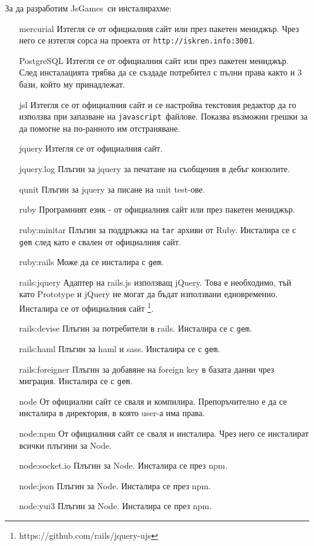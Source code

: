 \documentclass[a4paper]{article}
\def\js{\texttt{javascript}}
\def\jsg{JsGames}
\begin{document}
За да разработим \jsg \ си инсталирахме:
\begin{itemize}
  \item[mercurial] Изтегля се от официалния сайт или през пакетен мениджър. Чрез него се изтегля сорса на проекта от \texttt{http://iskren.info:3001}.
  \item[PostgreSQL] Изтегля се от официалния сайт или през пакетен мениджър. \\
    След инсталацията трябва да се създаде потребител с пълни права както и 3 бази, който му принадлежат.
  \item[jsl] Изтегля се от официалния сайт и се настройва текстовия редактор да го използва при запазване на \js\ файлове. Показва възможни грешки за да помогне на по-ранното им отстраняване.
  \item[jquery] Изтегля се от официалния сайт.
  \item[jquery.log] Плъгин за jquery за печатане на съобщения в дебъг конзолите.
  \item[qunit] Плъгин за jquery за писане на unit test-ове.
  \item[ruby] Програмният език - от официалния сайт или през пакетен мениджър.
  \item[ruby:minitar] Плъгин за поддръжка на \texttt{tar} архиви от Ruby. Инсталира се с \texttt{gem} след като е свален от официалния сайт.
  \item[ruby:rails] Може да се инсталира с \texttt{gem}.
  \item[rails:jquery] Адаптер на rails.js използващ jQuery. Това е необходимо, тъй като Prototype и jQuery не могат да бъдат използвани едновременно. Инсталира се от официалния сайт \footnote{https://github.com/rails/jquery-ujs}.
  \item[rails:devise] Плъгин за потребители в rails. Инсталира се с \texttt{gem}.
  \item[rails:haml] Плъгин за haml и sass. Инсталира се с \texttt{gem}.
  \item[rails:foreigner] Плъгин за добавяне на foreign key в базата данни чрез миграция. Инсталира се с \texttt{gem}.
  \item[node] От официални сайт се сваля и компилира. Препоръчително е да се инсталира в директория, в която user-а има права.
  \item[node:npm] От официалния сайт се сваля и инсталира. Чрез него се инсталират всички плъгини за Node.
  \item[node:socket.io] Плъгин за Node. Инсталира се през npm.
  \item[node:json] Плъгин за Node. Инсталира се през npm.
  \item[node:yui3] Плъгин за Node. Инсталира се през npm.
\end{itemize}
\end{document}
